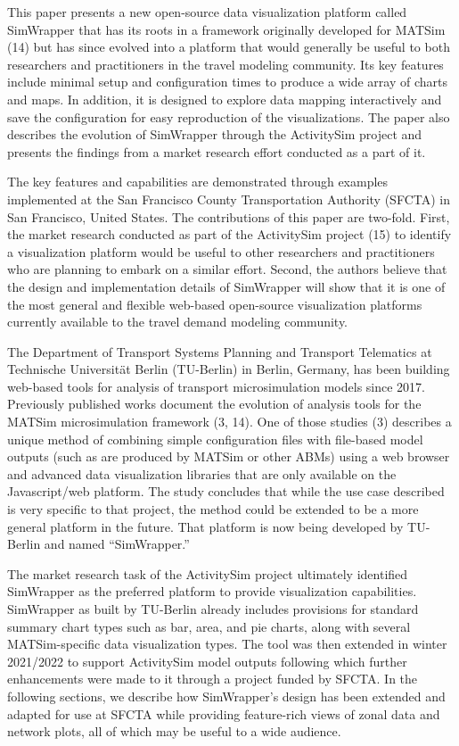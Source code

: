 \documentclass[3p,times,procedia]{elsarticle}
\begin{document}
This paper presents a new open-source data visualization platform called SimWrapper that has its roots in a framework originally developed for MATSim (14) but has since evolved into a platform that would generally be useful to both researchers and practitioners in the travel modeling community. Its key features include minimal setup and configuration times to produce a wide array of charts and maps. In addition, it is designed to explore data mapping interactively and save the configuration for easy reproduction of the visualizations. The paper also describes the evolution of SimWrapper through the ActivitySim project and presents the findings from a market research effort conducted as a part of it.

The key features and capabilities are demonstrated through examples implemented at the San Francisco County Transportation Authority (SFCTA) in San Francisco, United States. The contributions of this paper are two-fold. First, the market research conducted as part of the ActivitySim project (15) to identify a visualization platform would be useful to other researchers and practitioners who are planning to embark on a similar effort. Second, the authors believe that the design and implementation details of SimWrapper will show that it is one of the most general and flexible web-based open-source visualization platforms currently available to the travel demand modeling community.

The Department of Transport Systems Planning and Transport Telematics at Technische Universität Berlin (TU-Berlin) in Berlin, Germany, has been building web-based tools for analysis of transport microsimulation models since 2017. Previously published works document the evolution of analysis tools for the MATSim microsimulation framework (3, 14). One of those studies (3) describes a unique method of combining simple configuration files with file-based model outputs (such as are produced by MATSim or other ABMs) using a web browser and advanced data visualization libraries that are only available on the Javascript/web platform. The study concludes that while the use case described is very specific to that project, the method could be extended to be a more general platform in the future. That platform is now being developed by TU-Berlin and named “SimWrapper.”

The market research task of the ActivitySim project ultimately identified SimWrapper as the preferred platform to provide visualization capabilities. SimWrapper as built by TU-Berlin already includes provisions for standard summary chart types such as bar, area, and pie charts, along with several MATSim-specific data visualization types. The tool was then extended in winter 2021/2022 to support ActivitySim model outputs following which further enhancements were made to it through a project funded by SFCTA. In the following sections, we describe how SimWrapper’s design has been extended and adapted for use at SFCTA while providing feature-rich views of zonal data and network plots, all of which may be useful to a wide audience.
\end{document}
